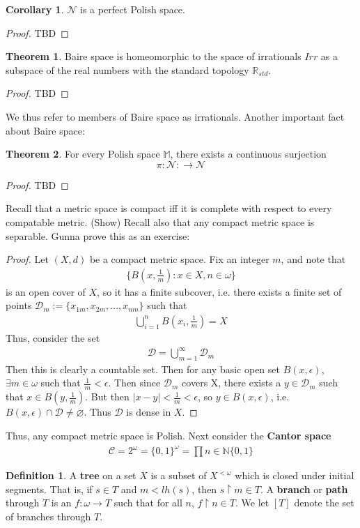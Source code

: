 \documentclass{article}
\theoremstyle{definition}
\newtheorem{definition}{Definition}[section]
\newtheorem{theorem}{Theorem}[section]
\newtheorem{corollary}{Corollary}[section]
\theoremstyle{plain}
\begin{document}
\begin{corollary}
$\mathcal{N}$ is a perfect Polish space.
\end{corollary}
\begin{proof}
TBD 
\end{proof}
\begin{theorem}
    Baire space is homeomorphic to the space of irrationals $Irr$ as a subspace of the real numbers with the standard topology $\mathbb{R}_{std}$.
\end{theorem}
\begin{proof}
TBD
\end{proof}
We thus refer to members of Baire space as irrationals. Another important fact about Baire space:
\begin{theorem}
    For every Polish space $\mathbb{M}$, there exists a continuous surjection 
    \[\pi: \mathcal{N}: \to \mathcal{N} \]
\end{theorem}
\begin{proof}
TBD
\end{proof}
Recall that a metric space is compact iff it is complete with respect to every compatable metric. (Show) Recall also that any compact metric space is separable. Gunna prove this as an exercise:
\begin{proof}
    Let $(X,d)$ be a compact metric space. Fix an integer $m$, and note that 
    \begin{align}
        \{B(x,\frac{1}{m}): x \in X, n \in \omega \}
    \end{align}
    is an open cover of $X$, so it has a finite subcover, i.e. there exists a finite set of points $\mathcal{D}_m := \{x_{1m},x_{2m},...,x_{nm}\}$ such that
    \begin{align}
        \bigcup_{i=1}^n B(x_i,\frac{1}{m}) = X
    \end{align}
    Thus, consider the set 
    \begin{align}
        \mathcal{D} = \bigcup_{m=1}^\infty \mathcal{D}_m
    \end{align}
    Then this is clearly a countable set. Then for any basic open set $B(x,\epsilon)$, $\exists m \in \omega$ such that $\frac{1}{m} < \epsilon$. Then since $\mathcal{D}_m$ covers X, there exists a $y \in \mathcal{D}_m$ such that $x \in B(y,\frac{1}{m})$. But then $|x-y| < \frac{1}{m} < \epsilon$, so $y \in B(x,\epsilon)$, i.e. $B(x,\epsilon) \cap \mathcal{D} \neq \varnothing$. Thus $\mathcal{D}$ is dense in $X$.
\end{proof}
Thus, any compact metric space is Polish. Next consider the \textbf{Cantor space} 
\begin{align}
    \mathcal{C} = 2^{\omega} = \{0,1\}^{\omega} = \prod{n \in \mathbb{N}}\{0,1\}
\end{align}
\begin{definition}
	A \textbf{tree} on a set $X$ is a subset of $X^{<\omega}$ which is closed under initial segments. That is, if $s \in T$ and $m < lh(s)$, then $s \restriction m \in T$. A \textbf{branch} or \textbf{path} through $T$ is an $f:\omega \to T$ such that for all $n$, $f \restriction n \in T$. We let $[T]$ denote the set of branches through $T$. 
\end{definition}
\end{document}
